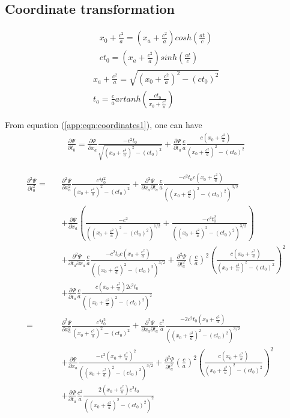 \documentclass[prd,showpacs,preprint]{revtex4}
\begin{document}
\begin{appendix}
\section{Coordinate transformation\label{app:Coordinate_Transformation}}
\begin{eqnarray}
x_0+\frac{c^2}{a}=(x_a+\frac{c^2}{a})cosh(\frac{at}{c})\nonumber\\
ct_0=(x_a+\frac{c^2}{a})sinh(\frac{at}{c})
\label{app:eqn:coordinates0}
\end{eqnarray}
\begin{eqnarray}
x_a+\frac{c^2}{a}=\sqrt{(x_0+\frac{c^2}{a})^2-(ct_0)^2}\nonumber\\
t_a=\frac{c}{a}artanh(\frac{ct_0}{x_0+\frac{c^2}{a}})
\label{app:eqn:coordinates1}
\end{eqnarray}

From equation (\ref{app:eqn:coordinates1}), one can have
\begin{eqnarray}
\frac{\partial \Psi}{\partial t_0}=\frac{\partial \Psi}{\partial x_a}\frac{-c^2t_0}{\sqrt{(x_0+\frac{c^2}{a})^2 - (ct_0)^2}} + \frac{\partial \Psi}{\partial t_a}\frac{c}{a}\frac{c(x_0+\frac{c^2}{a})}{(x_0+\frac{c^2}{a})^2-(ct_0)^2}
\label{eqn:Partial_Psi}
\end{eqnarray}

\begin{eqnarray}
\frac{\partial^2 \Psi}{\partial t_0^2}=&&\frac{\partial^2 \Psi}{\partial x_a^2}\frac{c^4t_0^2}{(x_0+\frac{c^2}{a})^2 - (ct_0)^2} + \frac{\partial^2 \Psi}{\partial x_a\partial t_a}\frac{c}{a}\frac{-c^2t_0c(x_0+\frac{c^2}{a})}{((x_0+\frac{c^2}{a})^2-(ct_0)^2)^{3/2}}\nonumber\\
&& + \frac{\partial \Psi}{\partial x_a}(\frac{-c^2}{((x_0+\frac{c^2}{a})^2-(ct_0)^2)^{1/2}} + \frac{-c^4t_0^2}{((x_0+\frac{c^2}{a})^2-(ct_0)^2)^{3/2}})\nonumber\\
&& + \frac{\partial^2 \Psi}{\partial t_a\partial x_a}\frac{c}{a}\frac{-c^2t_0c(x_0+\frac{c^2}{a})}{((x_0+\frac{c^2}{a})^2-(ct_0)^2)^{3/2}} + \frac{\partial^2 \Psi}{\partial t_a^2}(\frac{c}{a})^2(\frac{c(x_0+\frac{c^2}{a})}{(x_0+\frac{c^2}{a})^2-(ct_0)^2})^2\nonumber\\
&&+\frac{\partial \Psi}{\partial t_a}\frac{c}{a}\frac{c(x_0+\frac{c^2}{a})2c^2t_0}{((x_0+\frac{c^2}{a})^2-(ct_0)^2)^2}\nonumber\\
=&&\frac{\partial^2 \Psi}{\partial x_a^2}\frac{c^4t_0^2}{(x_0+\frac{c^2}{a})^2 - (ct_0)^2} + \frac{\partial^2 \Psi}{\partial x_a\partial t_a}\frac{c^2}{a}\frac{-2c^2t_0(x_0+\frac{c^2}{a})}{((x_0+\frac{c^2}{a})^2-(ct_0)^2)^{3/2}}\nonumber\\
&& + \frac{\partial \Psi}{\partial x_a}\frac{-c^2(x_0+\frac{c^2}{a})^2}{((x_0+\frac{c^2}{a})^2-(ct_0)^2)^{3/2}} + \frac{\partial^2 \Psi}{\partial t_a^2}(\frac{c}{a})^2(\frac{c(x_0+\frac{c^2}{a})}{(x_0+\frac{c^2}{a})^2-(ct_0)^2})^2\nonumber\\
&& + \frac{\partial \Psi}{\partial t_a}\frac{c^2}{a}\frac{2(x_0+\frac{c^2}{a})c^2t_0}{((x_0+\frac{c^2}{a})^2-(ct_0)^2)^2}
\label{app:eqn:Partial2_Psi_Partial_t2}
\end{eqnarray}


\end{appendix}
\end{document}
